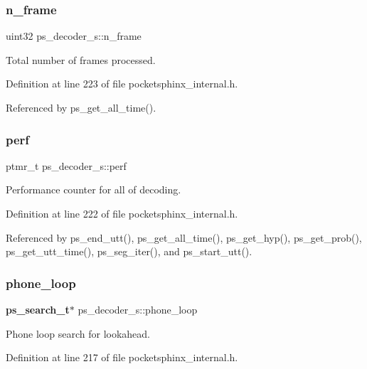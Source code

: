 \subsubsection{n\+\_\+frame}
{\footnotesize\ttfamily uint32 ps\+\_\+decoder\+\_\+s\+::n\+\_\+frame}



Total number of frames processed. 



Definition at line 223 of file pocketsphinx\+\_\+internal.\+h.



Referenced by ps\+\_\+get\+\_\+all\+\_\+time().

\mbox{\label{structps__decoder__s_ab42d1d1e300d2a6df5dd3cd796a27d43}} 
\subsubsection{perf}
{\footnotesize\ttfamily ptmr\+\_\+t ps\+\_\+decoder\+\_\+s\+::perf}



Performance counter for all of decoding. 



Definition at line 222 of file pocketsphinx\+\_\+internal.\+h.



Referenced by ps\+\_\+end\+\_\+utt(), ps\+\_\+get\+\_\+all\+\_\+time(), ps\+\_\+get\+\_\+hyp(), ps\+\_\+get\+\_\+prob(), ps\+\_\+get\+\_\+utt\+\_\+time(), ps\+\_\+seg\+\_\+iter(), and ps\+\_\+start\+\_\+utt().

\mbox{\label{structps__decoder__s_a0c6d141d7a71a1287be00a1ebcc7643d}} 
\subsubsection{phone\+\_\+loop}
{\footnotesize\ttfamily \textbf{ ps\+\_\+search\+\_\+t}$\ast$ ps\+\_\+decoder\+\_\+s\+::phone\+\_\+loop}



Phone loop search for lookahead. 



Definition at line 217 of file pocketsphinx\+\_\+internal.\+h.



